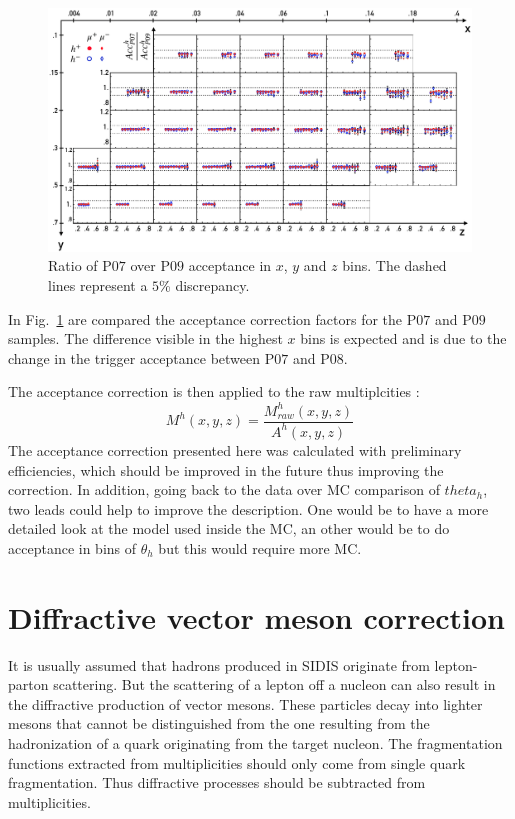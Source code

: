 \begin{figure}
  \centering
	\includegraphics[scale=0.7]{./gfx/SysAcc.png}
	\caption{Ratio of P$07$ over P$09$ acceptance in $x$, $y$ and $z$ bins. The dashed lines represent a $5$\% discrepancy.}
	\label{pic:AccPer}
\end{figure}

In Fig.~\ref{pic:AccPer} are compared the acceptance correction factors for the P$07$ and P$09$ samples. The difference visible in the highest $x$ bins is expected and is due to the change in the trigger acceptance between P$07$ and P$08$.

The acceptance correction is then applied to the raw multiplcities :
%
\begin{equation}
  M^h(x,y,z) = \frac{M^h_{raw}(x,y,z)}{A^h(x,y,z)}
\end{equation}
%
The acceptance correction presented here was calculated with preliminary efficiencies, which should be improved in the future thus improving the correction. In addition, going back to the data over MC comparison of $theta_h$, two leads could help to improve the description. One would be to have a more detailed look at the model used inside the MC, an other would be to do acceptance in bins of $\theta_h$ but this would require more MC.

\section{Diffractive vector meson correction} \label{sec:DVMf}

It is usually assumed that hadrons produced in SIDIS originate from lepton-parton scattering. But the scattering of a lepton off a nucleon can also result in the diffractive production of vector mesons. These particles decay into lighter mesons that cannot be distinguished from the one resulting from the hadronization of a quark originating from the target nucleon. The fragmentation functions extracted from multiplicities should only come from single quark fragmentation. Thus diffractive processes should be subtracted from multiplicities.

